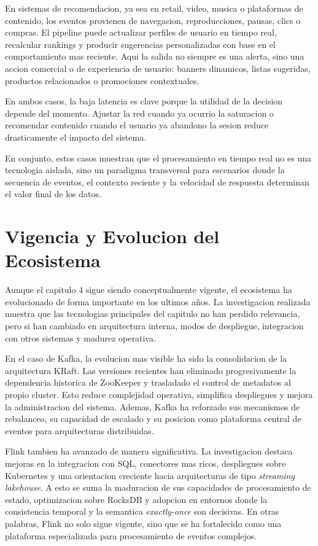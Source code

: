 \documentclass[12pt,a4paper]{article}
\begin{document}
En sistemas de recomendacion, ya sea en retail, video, musica o plataformas de contenido, los eventos provienen de navegacion, reproducciones, pausas, clics o compras. El pipeline puede actualizar perfiles de usuario en tiempo real, recalcular rankings y producir sugerencias personalizadas con base en el comportamiento mas reciente. Aqui la salida no siempre es una alerta, sino una accion comercial o de experiencia de usuario: banners dinamicos, listas sugeridas, productos relacionados o promociones contextuales.

En ambos casos, la baja latencia es clave porque la utilidad de la decision depende del momento. Ajustar la red cuando ya ocurrio la saturacion o recomendar contenido cuando el usuario ya abandono la sesion reduce drasticamente el impacto del sistema.

En conjunto, estos casos muestran que el procesamiento en tiempo real no es una tecnologia aislada, sino un paradigma transversal para escenarios donde la secuencia de eventos, el contexto reciente y la velocidad de respuesta determinan el valor final de los datos.

\section{Vigencia y Evolucion del Ecosistema}

Aunque el capitulo 4 sigue siendo conceptualmente vigente, el ecosistema ha evolucionado de forma importante en los ultimos años. La investigacion realizada muestra que las tecnologias principales del capitulo no han perdido relevancia, pero si han cambiado en arquitectura interna, modos de despliegue, integracion con otros sistemas y madurez operativa.

En el caso de Kafka, la evolucion mas visible ha sido la consolidacion de la arquitectura KRaft. Las versiones recientes han eliminado progresivamente la dependencia historica de ZooKeeper y trasladado el control de metadatos al propio cluster. Esto reduce complejidad operativa, simplifica despliegues y mejora la administracion del sistema. Ademas, Kafka ha reforzado sus mecanismos de rebalanceo, su capacidad de escalado y su posicion como plataforma central de eventos para arquitecturas distribuidas.

Flink tambien ha avanzado de manera significativa. La investigacion destaca mejoras en la integracion con SQL, conectores mas ricos, despliegues sobre Kubernetes y una orientacion creciente hacia arquitecturas de tipo \textit{streaming lakehouse}. A esto se suma la maduracion de sus capacidades de procesamiento de estado, optimizacion sobre RocksDB y adopcion en entornos donde la consistencia temporal y la semantica \textit{exactly-once} son decisivas. En otras palabras, Flink no solo sigue vigente, sino que se ha fortalecido como una plataforma especializada para procesamiento de eventos complejos.
\end{document}
